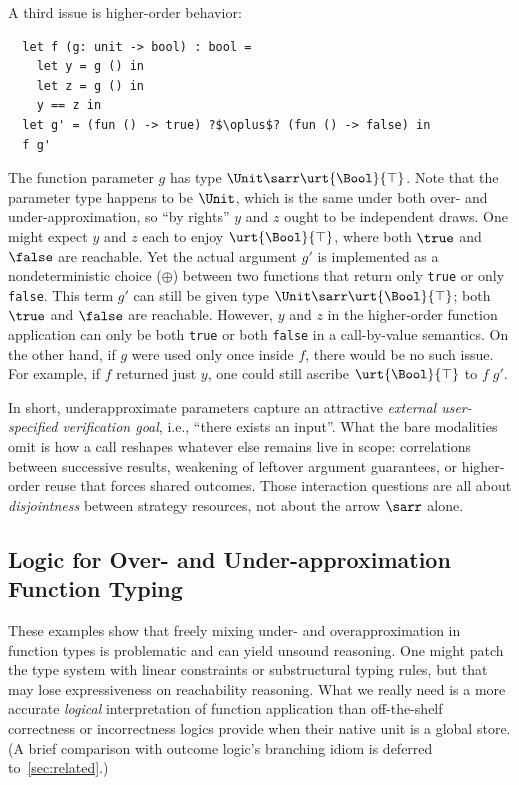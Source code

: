 A third issue is higher-order behavior:
\begin{verbatim}
  let f (g: unit -> bool) : bool =
    let y = g () in
    let z = g () in
    y == z in
  let g' = (fun () -> true) ?$\oplus$? (fun () -> false) in
  f g'
\end{verbatim}
The function parameter $g$ has type $\Unit \sarr \urt{\Bool}{\top}$. Note that the parameter type happens to be $\Unit$, which is the same under both over- and under-approximation, so ``by rights'' $y$ and $z$ ought to be independent draws.
One might expect $y$ and
$z$ each to enjoy $\urt{\Bool}{\top}$, where both $\true$ and $\false$ are reachable.
Yet the actual argument $g'$ is implemented as a nondeterministic choice ($\oplus$) between
two functions that return only \texttt{true} or only \texttt{false}.
This term $g'$ can still be given type $\Unit \sarr \urt{\Bool}{\top}$; both $\true$ and $\false$ are reachable.
However, $y$ and $z$ in the higher-order function application can only be both \texttt{true} or both \texttt{false} in a call-by-value semantics.
On the other hand, if $g$ were used only once inside $f$, there would be no such issue. For example, if $f$
returned just $y$, one could still ascribe $\urt{\Bool}{\top}$ to
$f\;g'$.

In short, underapproximate parameters capture an attractive \emph{external user-specified verification goal}, i.e., ``there exists an input''.
What the bare modalities omit is how a call reshapes whatever else remains live in scope: correlations between successive results, weakening of leftover argument guarantees, or higher-order reuse that forces shared outcomes.
Those interaction questions are all about \emph{disjointness} between strategy resources, not about the arrow $\sarr$ alone.

\subsection{Logic for Over- and Under-approximation Function Typing}

These examples show that freely mixing under- and overapproximation in
function types is problematic and can yield unsound reasoning.
One might patch the type system with linear constraints or substructural typing rules, but
that may lose expressiveness on reachability reasoning.
What we really need is a more accurate \emph{logical} interpretation of function
application than off-the-shelf correctness or incorrectness logics provide when their native unit is a global store.
(A brief comparison with outcome logic's branching idiom is deferred to~\autoref{sec:related}.)

